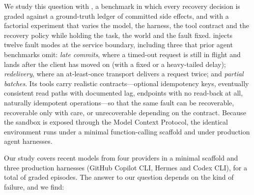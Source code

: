 We study this question with \bench{}, a benchmark in which every recovery decision is graded against a
ground-truth ledger of committed side effects, and with a factorial experiment that varies the model, the
harness, the tool contract and the recovery policy while holding the task, the world and the fault fixed.
\bench{} injects twelve fault modes at the service boundary, including three that prior agent benchmarks
omit: \emph{late commits}, where a timed-out request is still in flight and lands after the client has
moved on (with a fixed or a heavy-tailed delay); \emph{redelivery}, where an at-least-once transport delivers a
request twice; and \emph{partial batches}. Its tools carry realistic contracts---optional idempotency keys,
eventually consistent read paths with documented lag, endpoints with no read-back at all, naturally idempotent
operations---so that the same fault can be recoverable, recoverable only with care, or unrecoverable depending on
the contract. Because the sandbox is exposed through the Model Context Protocol, the identical environment runs
under a minimal function-calling scaffold and under production agent harnesses.

Our study covers \NModels{} recent models from four providers in a minimal scaffold and three production
harnesses (GitHub Copilot CLI, Hermes and Codex CLI), for a total of \NEpisodesAll{} graded episodes.
The answer to our question depends on the kind of failure, and we find:

